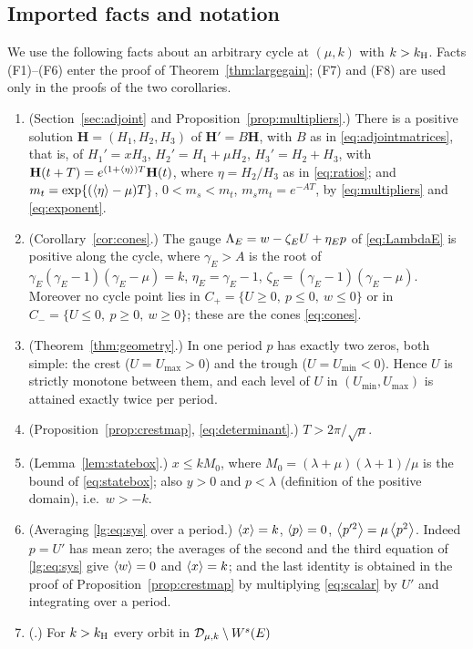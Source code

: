 \subsection{Imported facts and notation}\label{lg:sec:imports}
We use the following facts about an arbitrary cycle at $(\mu,k)$ with $k>k_{\mathrm H}$. Facts (F1)--(F6) enter the proof of Theorem~\ref{thm:largegain}; (F7) and (F8) are used only in the proofs of the two corollaries.
\begin{enumerate}[label=\textup{(F\arabic*)}]
\item (Section~\ref{sec:adjoint} and Proposition~\ref{prop:multipliers}.) There is a positive solution $\mathbf H=(H_1,H_2,H_3)$ of $\mathbf H'=B\mathbf H$, with $B$ as in \eqref{eq:adjointmatrices}, that is, of
$H_1'=xH_3$, $H_2'=H_1+\mu H_2$, $H_3'=H_2+H_3$, with $\mathbf H(t+T)=e^{(1+\left\langle \eta\right\rangle)T}\mathbf H(t)$, where $\eta=H_2/H_3$ as in \eqref{eq:ratios}; and
$m_t=\exp\{(\left\langle \eta\right\rangle-\mu)T\}$, $0<m_s<m_t$, $m_sm_t=e^{-AT}$, by \eqref{eq:multipliers} and \eqref{eq:exponent}.
\item (Corollary~\ref{cor:cones}.) The gauge $\Lambda_E=w-\zeta_EU+\eta_Ep$ of \eqref{eq:LambdaE} is positive along the cycle, where $\gamma_E>A$ is the
root of $\gamma_E(\gamma_E-1)(\gamma_E-\mu)=k$, $\eta_E=\gamma_E-1$, $\zeta_E=(\gamma_E-1)(\gamma_E-\mu)$.
Moreover no cycle point lies in $C_+=\{U\ge0,\ p\le0,\ w\le0\}$ or in $C_-=\{U\le0,\ p\ge0,\ w\ge0\}$; these are the cones \eqref{eq:cones}.
\item (Theorem~\ref{thm:geometry}.) In one period $p$ has exactly two zeros, both simple: the crest ($U=U_{\max}>0$)
and the trough ($U=U_{\min}<0$). Hence $U$ is strictly monotone between them, and each level of $U$ in
$(U_{\min},U_{\max})$ is attained exactly twice per period.
\item (Proposition~\ref{prop:crestmap}, \eqref{eq:determinant}.) $T>2\pi/\sqrt\mu$.
\item (Lemma~\ref{lem:statebox}.) $x\le kM_0$, where $M_0=(\lambda+\mu)(\lambda+1)/\mu$ is the bound of \eqref{eq:statebox}; also $y>0$ and
$p<\lambda$ (definition of the positive domain), i.e.\ $w>-k$.
\item (Averaging \eqref{lg:eq:sys} over a period.) $\left\langle x\right\rangle=k$, $\left\langle p\right\rangle=0$,
$\left\langle p'^2\right\rangle=\mu\left\langle p^2\right\rangle$. Indeed $p=U'$ has mean zero; the averages of the second and the third equation of \eqref{lg:eq:sys} give $\left\langle w\right\rangle=0$ and $\left\langle x\right\rangle=k$; and the last identity is obtained in the proof of Proposition~\ref{prop:crestmap} by multiplying \eqref{eq:scalar} by $U'$ and integrating over a period.
\item (\cite[Theorem~1.1(c)]{Smith12}.) For $k>k_{\mathrm H}$ every orbit in $\mathcal D_{\mu,k}\setminus W^s(E)$

\end{enumerate}
